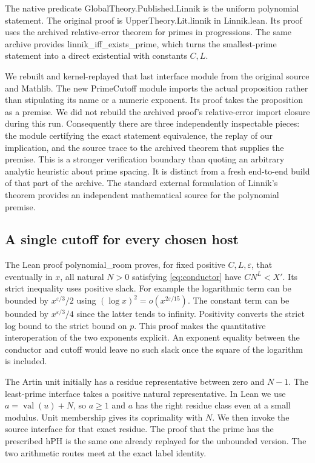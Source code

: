 \documentclass[12pt,letterpaper]{article}
\DeclareRobustCommand{\id}[1]{\mbox{\small\ttfamily #1}}
\begin{document}
The native predicate \id{GlobalTheory.Published.Linnik} is the uniform polynomial statement. The original proof is \id{UpperTheory.Lit.linnik} in \id{Linnik.lean}. Its proof uses the archived relative-error theorem for primes in progressions. The same archive provides \id{linnik\_iff\_exists\_prime}, which turns the smallest-prime statement into a direct existential with constants \(C,L\).

We rebuilt and kernel-replayed that last interface module from the original source and Mathlib. The new \id{PrimeCutoff} module imports the actual proposition rather than stipulating its name or a numeric exponent. Its proof takes the proposition as a premise. We did not rebuild the archived proof's relative-error import closure during this run. Consequently there are three independently inspectable pieces: the module certifying the exact statement equivalence, the replay of our implication, and the source trace to the archived theorem that supplies the premise. This is a stronger verification boundary than quoting an arbitrary analytic heuristic about prime spacing. It is distinct from a fresh end-to-end build of that part of the archive. The standard external formulation of Linnik's theorem provides an independent mathematical source for the polynomial premise.

\subsection{A single cutoff for every chosen host}

The Lean proof \id{polynomial\_room} proves, for fixed positive \(C,L,\varepsilon\), that eventually in \(x\), all natural \(N>0\) satisfying \eqref{eq:conductor} have \(CN^L<X'\). Its strict inequality uses positive slack. For example the logarithmic term can be bounded by \(x^{\varepsilon/3}/2\) using \((\log x)^2=o(x^{2\varepsilon/15})\). The constant term can be bounded by \(x^{\varepsilon/3}/4\) since the latter tends to infinity. Positivity converts the strict log bound to the strict bound on \(p\). This proof makes the quantitative interoperation of the two exponents explicit. An exponent equality between the conductor and cutoff would leave no such slack once the square of the logarithm is included.

The Artin unit initially has a residue representative between zero and \(N-1\). The least-prime interface takes a positive natural representative. In Lean we use \(a=\operatorname{val}(u)+N\), so \(a\ge1\) and \(a\) has the right residue class even at a small modulus. Unit membership gives its coprimality with \(N\). We then invoke the source interface for that exact residue. The proof that the prime has the prescribed \id{hPH} is the same one already replayed for the unbounded version. The two arithmetic routes meet at the exact label identity.
\end{document}
